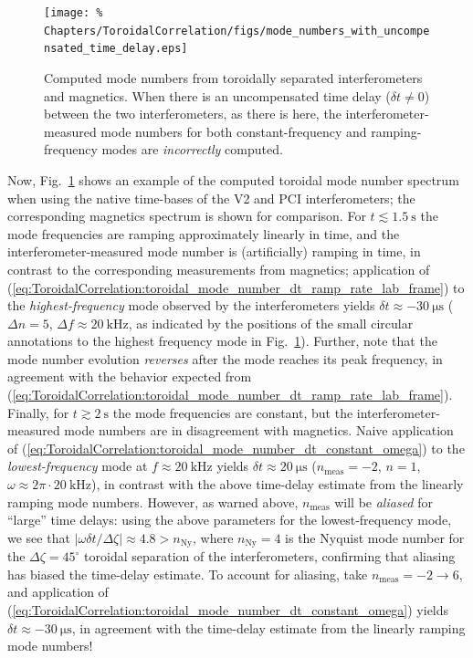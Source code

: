 \begin{figure}
  \centering
  \texttt{[image: \%
    Chapters/ToroidalCorrelation/figs/mode\_numbers\_with\_uncompensated\_time\_delay.eps]}
  \caption[Effect of uncompensated time delay on computed toroidal mode numbers]{%
    Computed mode numbers from
    toroidally separated interferometers and magnetics.
    When there is an uncompensated time delay ($\delta t \neq 0$)
    between the two interferometers, as there is here,
    the interferometer-measured mode numbers
    for both constant-frequency and ramping-frequency modes
    are \emph{incorrectly} computed.}
\label{fig:ToroidalCorrelation:uncompensated_time_delay}
\end{figure}

\graffito{\textcolor{red}{Improve discussion of two estimates}}
Now, Fig.~\ref{fig:ToroidalCorrelation:uncompensated_time_delay} shows an example
of the computed toroidal mode number spectrum
when using the native time-bases of the V2 and PCI interferometers;
the corresponding magnetics spectrum is shown for comparison.
For $t \lesssim \SI{1.5}{\second}$
the mode frequencies are ramping approximately linearly in time, and
the interferometer-measured mode number is (artificially) ramping in time,
in contrast to the corresponding measurements from magnetics;
application of
(\ref{eq:ToroidalCorrelation:toroidal_mode_number_dt_ramp_rate_lab_frame})
to the \emph{highest-frequency} mode observed by the interferometers yields
$\delta t \approx \SI{-30}{\micro\second}$
($\Delta n = 5$, $\Delta f \approx \SI{20}{\kilo\hertz}$,
as indicated by the positions of the small circular annotations
to the highest frequency mode in
Fig.~\ref{fig:ToroidalCorrelation:uncompensated_time_delay}).
Further, note that the mode number evolution \emph{reverses}
after the mode reaches its peak frequency,
in agreement with the behavior expected from
(\ref{eq:ToroidalCorrelation:toroidal_mode_number_dt_ramp_rate_lab_frame}).
Finally, for $t \gtrsim \SI{2}{\second}$
the mode frequencies are constant, but
the interferometer-measured mode numbers are in disagreement with magnetics.
Naive application of
(\ref{eq:ToroidalCorrelation:toroidal_mode_number_dt_constant_omega})
to the \emph{lowest-frequency} mode at $f \approx \SI{20}{\kilo\hertz}$
yields $\delta t \approx \SI{20}{\micro\second}$
($n_{\text{meas}} = -2$, $n = 1$,
$\omega \approx 2 \pi \cdot \SI{20}{\kilo\hertz}$),
in contrast with the above time-delay estimate
from the linearly ramping mode numbers.
However, as warned above,
$n_{\text{meas}}$ will be \emph{aliased} for ``large'' time delays:
using the above parameters for the lowest-frequency mode,
we see that $|\omega \delta t / \Delta \zeta| \approx 4.8 > n_{\text{Ny}}$,
where $n_{\text{Ny}} = 4$ is the Nyquist mode number
for the $\Delta \zeta = 45^{\circ}$ toroidal separation of the interferometers,
confirming that aliasing has biased the time-delay estimate.
To account for aliasing, take $n_{\text{meas}} = -2 \rightarrow 6$, and
application of
(\ref{eq:ToroidalCorrelation:toroidal_mode_number_dt_constant_omega}) yields
$\delta t \approx -\SI{30}{\micro\second}$,
in agreement with the time-delay estimate
from the linearly ramping mode numbers!

